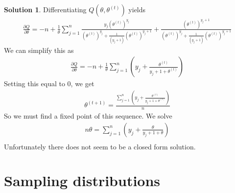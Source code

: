 \documentclass[11pt]{amsart}
\theoremstyle{definition}
\newtheorem{solution}[theorem]{Solution}
\numberwithin{equation}{section}
\begin{document}
\begin{solution}
    Differentiating $Q(\theta,\theta^{(t)})$ yields
    \begin{align*}
        \frac{\partial Q}{\partial \theta}=-n+\frac{1}{\theta}\sum_{j=1}^n\frac{y_j(\theta^{(t)})^{y_j}}{(\theta^{(t)})^{y_j}+\frac{1}{(y_j+1)}(\theta^{(t)})^{y_j+1}}+\frac{(\theta^{(t)})^{y_j+1}}{(\theta^{(t)})^{y_j}+\frac{1}{(y_j+1)}(\theta^{(t)})^{y_j+1}}
    \end{align*}
    We can simplify this as 
    \begin{align*}
        \frac{\partial Q}{\partial \theta} = -n + \frac{1}{\theta}\sum_{j=1}^n\left(y_j + \frac{\theta^{(t)}}{y_j+1+\theta^{(t)}}\right)
    \end{align*}
    Setting this equal to $0$, we get
    \begin{align*}
        \theta^{(t+1)}=\frac{\sum_{j=1}^n\left(y_j + \frac{\theta^{(t)}}{y_j+1+\theta^{(t)}}\right)}{n}
    \end{align*}
    So we must find a fixed point of this sequence. We solve
    \begin{align*}
        n\theta=\sum_{j=1}^n\left(y_j+\frac{\theta}{y_j+1+\theta}\right)\\
    \end{align*}
    Unfortunately there does not seem to be a closed form solution.
\end{solution}
\newpage
\section{Sampling distributions}
\end{document}
